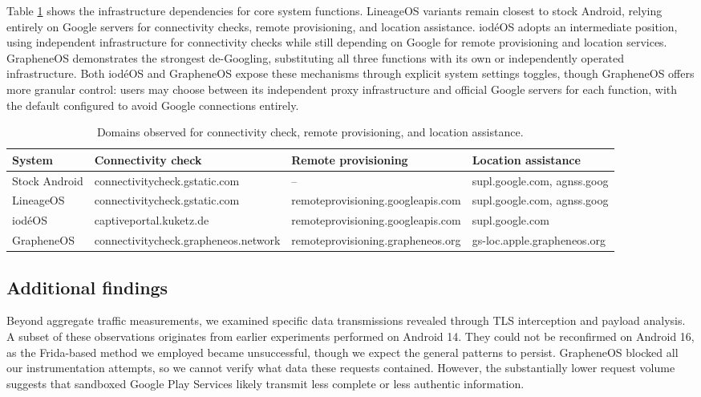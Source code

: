 Table \ref{tab:domains-mechanisms} shows the infrastructure dependencies for core system functions. LineageOS variants remain closest to stock Android, relying entirely on Google servers for connectivity checks, remote provisioning, and location assistance. iod\'eOS adopts an intermediate position, using independent infrastructure for connectivity checks while still depending on Google for remote provisioning and location services. GrapheneOS demonstrates the strongest de-Googling, substituting all three functions with its own or independently operated infrastructure. Both iod\'eOS and GrapheneOS expose these mechanisms through explicit system settings toggles, though GrapheneOS offers more granular control: users may choose between its independent proxy infrastructure and official Google servers for each function, with the default configured to avoid Google connections entirely.

\begin{table}
	\caption{Domains observed for connectivity check, remote provisioning, and location assistance.}
	\label{tab:domains-mechanisms}
	\begin{tabular}{llll}
		\toprule
		System & Connectivity check & Remote provisioning & Location assistance \\
		\midrule
		Stock Android & connectivitycheck.gstatic.com & -- & supl.google.com, agnss.goog \\
		LineageOS & connectivitycheck.gstatic.com & remoteprovisioning.googleapis.com & supl.google.com, agnss.goog \\
		iod\'eOS & captiveportal.kuketz.de & remoteprovisioning.googleapis.com & supl.google.com \\
		GrapheneOS & connectivitycheck.grapheneos.network & remoteprovisioning.grapheneos.org & gs-loc.apple.grapheneos.org \\
		\bottomrule
	\end{tabular}
\end{table}

\subsection{Additional findings}

Beyond aggregate traffic measurements, we examined specific data transmissions revealed through TLS interception and payload analysis. A subset of these observations originates from earlier experiments performed on Android 14. They could not be reconfirmed on Android 16, as the Frida-based method we employed became unsuccessful, though we expect the general patterns to persist. GrapheneOS blocked all our instrumentation attempts, so we cannot verify what data these requests contained. However, the substantially lower request volume suggests that sandboxed Google Play Services likely transmit less complete or less authentic information.

